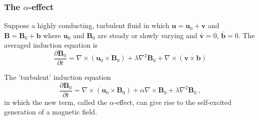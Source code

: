 \documentclass[12pt,a4paper]{article}
\renewcommand{\vec}[1]{\boldsymbol{#1}}
\begin{document}
\subsubsection{The $\alpha$-effect}
Suppose a highly conducting, turbulent fluid in which $\vec{u} = \vec{u}_0 + \vec{v}$ and $\vec{B} = \vec{B}_0 + \vec{b}$ where $\vec{u}_0$ and $\vec{B}_0$ are steady or slowly varying and $\bar{\vec{v}} = 0$, $\bar{\vec{b}} = 0$. The averaged induction equation is
\begin{equation*}
\frac{\partial \vec{B}_0}{\partial t} = \nabla \times (\vec{u}_0 \times \vec{B}_0) +\lambda \nabla^2 \vec{B}_0 +\nabla \times \overline{(\vec{v}\times \vec{b})}
\end{equation*}

The 'turbulent' induction equation
\begin{equation*}
\frac{\partial \vec{B}_0}{\partial t} = \nabla \times (\vec{u}_0 \times \vec{B}_0) +\alpha \nabla \times \vec{B}_0  +\lambda \nabla^2 \vec{B}_0 ~,
\end{equation*}
in which the new term, called the $\alpha$-effect, can give rise to the self-excited generation of a magnetic field.
\end{document}
